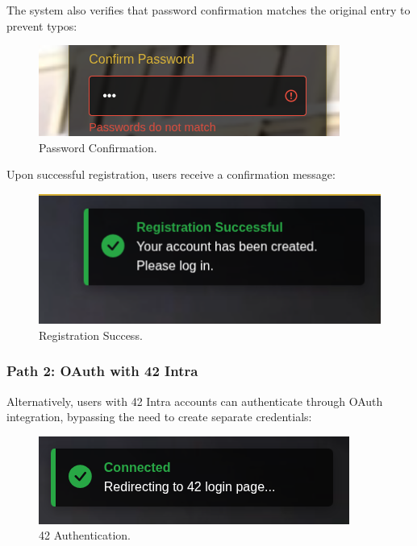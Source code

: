 The system also verifies that password confirmation matches the original entry to prevent typos:

\begin{figure}[H]
    \centering
    \includegraphics[width=0.6\linewidth]{Figures/images/new_images/ErrorConfirmPassword.png}
    \caption{Password Confirmation.} %
    \label{fig:error-confirm-password-wireframe}
\end{figure}

Upon successful registration, users receive a confirmation message:

\begin{figure}[H]
    \centering
    \includegraphics[width=0.6\linewidth]{Figures/images/new_images/RegistrationSuccess.png}
    \caption{Registration Success.} %
    \label{fig:registration-success-wireframe}
\end{figure}

\subsubsection{Path 2: OAuth with 42 Intra} Alternatively, users with 42 Intra accounts can authenticate through OAuth integration, bypassing the need to create separate credentials:

\begin{figure}[H]
    \centering
    \includegraphics[width=0.6\linewidth]{Figures/images/new_images/42Login.png}
    \caption{42 Authentication.} %
    \label{fig:42-login}
\end{figure}

